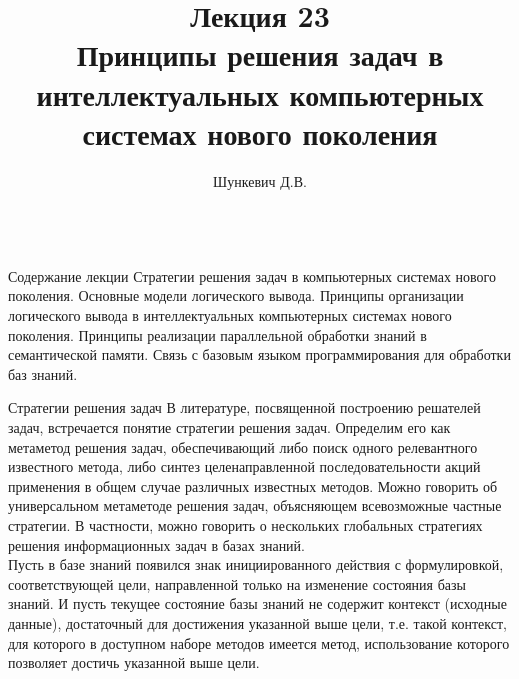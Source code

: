 \title{Лекция 23\\Принципы решения задач в интеллектуальных компьютерных системах нового поколения}
\author[]{Шункевич Д.В.}

\begin{frame}
	\titlepage
\end{frame}

\begin{frame}{\\Содержание лекции}
	\topline
	\justifying
	Стратегии решения задач в компьютерных системах нового поколения. Основные модели логического вывода. Принципы организации логического вывода в интеллектуальных компьютерных системах нового поколения. Принципы реализации параллельной обработки знаний в семантической памяти. Связь с базовым языком программирования для обработки баз знаний. 
\end{frame}

\begin{frame}{Стратегии решения задач}
\vspace{20}
    В литературе, посвященной построению решателей задач, встречается понятие стратегии решения задач. Определим его как метаметод решения задач, обеспечивающий либо поиск одного релевантного известного метода, либо синтез целенаправленной последовательности акций применения в общем случае различных известных методов. Можно говорить об универсальном метаметоде решения задач, объясняющем всевозможные частные стратегии. В частности, можно говорить о нескольких глобальных стратегиях решения информационных задач в базах знаний.\\
    Пусть в базе знаний появился знак инициированного действия с формулировкой, соответствующей цели, направленной только на изменение состояния базы знаний. И пусть текущее состояние базы знаний не содержит контекст (исходные данные), достаточный для достижения указанной выше цели, т.е. такой контекст, для которого в доступном наборе методов имеется метод, использование которого позволяет достичь указанной выше цели.
\end{frame}

